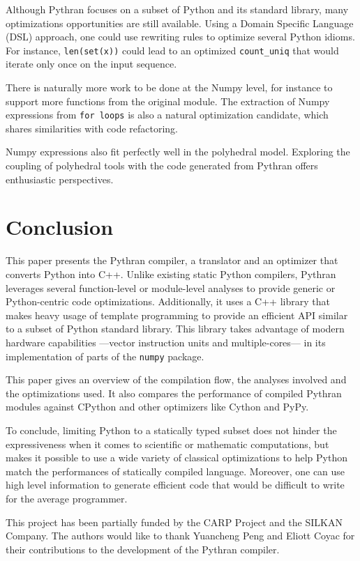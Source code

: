\documentclass[10pt, onecolumn, preprint]{sigplanconf}
\begin{document}
Although Pythran focuses on a subset of Python and its standard library, many
optimizations opportunities are still available. Using a Domain Specific
Language (DSL) approach, one could use rewriting rules to optimize several
Python idioms. For instance, \texttt{len(set(x))} could lead to an optimized
\texttt{count\_uniq} that would iterate only once on the input sequence.

There is naturally more work to be done at the Numpy level, for instance to
support more functions from the original module. The extraction of Numpy
expressions from \texttt{for loops} is also a natural optimization candidate, which
shares similarities with code refactoring.

Numpy expressions also fit perfectly well in the polyhedral model. Exploring
the coupling of polyhedral tools with the code generated from Pythran offers
enthusiastic perspectives.

\section{Conclusion}

This paper presents the Pythran compiler, a translator and an optimizer that
converts Python into C++. Unlike existing static Python compilers, Pythran
leverages several function-level or module-level analyses to provide
generic or Python-centric code optimizations. Additionally, it uses a C++
library that makes heavy usage of template programming to provide an efficient
API similar to a subset of Python standard library. This library takes
advantage of modern hardware capabilities ---vector instruction units and
multiple-cores--- in its implementation of parts of the \texttt{numpy} package.

This paper gives an overview of the compilation flow, the analyses involved and
the optimizations used. It also compares the performance of compiled Pythran
modules against CPython and other optimizers like Cython and PyPy.

To conclude, limiting Python to a statically typed subset does not hinder the
expressiveness when it comes to scientific or mathematic computations, but makes
it possible to use a wide variety of classical optimizations to help Python
match the performances of statically compiled language. Moreover, one can use
high level information to generate efficient code that would be difficult to
write for the average programmer.



\acks


This project has been partially funded by the CARP Project and the SILKAN
Company.  The authors would like to thank Yuancheng Peng and Eliott Coyac for
their contributions to the development of the Pythran compiler.




\end{document}
